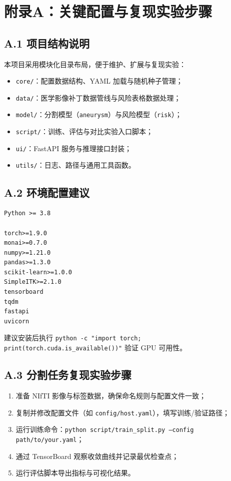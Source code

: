 \section*{附录A：关键配置与复现实验步骤}

\subsection*{A.1 项目结构说明}
本项目采用模块化目录布局，便于维护、扩展与复现实验：
\begin{itemize}
\item \texttt{core/}：配置数据结构、YAML 加载与随机种子管理；
\item \texttt{data/}：医学影像补丁数据管线与风险表格数据处理；
\item \texttt{model/}：分割模型（\texttt{aneurysm}）与风险模型（\texttt{risk}）；
\item \texttt{script/}：训练、评估与对比实验入口脚本；
\item \texttt{ui/}：FastAPI 服务与推理接口封装；
\item \texttt{utils/}：日志、路径与通用工具函数。
\end{itemize}

\subsection*{A.2 环境配置建议}
\begin{verbatim}
Python >= 3.8

torch>=1.9.0
monai>=0.7.0
numpy>=1.21.0
pandas>=1.3.0
scikit-learn>=1.0.0
SimpleITK>=2.1.0
tensorboard
tqdm
fastapi
uvicorn
\end{verbatim}
建议安装后执行 \texttt{python -c "import torch; print(torch.cuda.is\_available())"} 验证 GPU 可用性。

\subsection*{A.3 分割任务复现实验步骤}
\begin{enumerate}
\item 准备 NIfTI 影像与标签数据，确保命名规则与配置文件一致；
\item 复制并修改配置文件（如 \texttt{config/host.yaml}），填写训练/验证路径；
\item 运行训练命令：\texttt{python script/train\_split.py --config path/to/your.yaml}；
\item 通过 TensorBoard 观察收敛曲线并记录最优检查点；
\item 运行评估脚本导出指标与可视化结果。
\end{enumerate}

